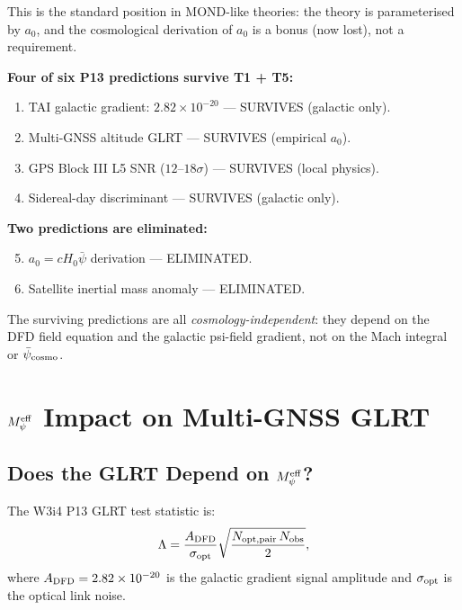 \documentclass[aps,prd,twocolumn,superscriptaddress,nofootinbib]{revtex4-2}
\newcommand{\Meff}{M_\psi^{\rm eff}}
\newcommand{\ee}[1]{\times 10^{#1}}
\begin{document}
This is the standard position in MOND-like theories: the theory is
parameterised by $a_0$, and the cosmological derivation of $a_0$ is a
bonus (now lost), not a requirement.

\begin{survivalbox}[title={T1 Survival Summary for P13}]
\textbf{Four of six P13 predictions survive T1 + T5:}
\begin{enumerate}
\item TAI galactic gradient: $2.82\ee{-20}$ --- SURVIVES (galactic only).
\item Multi-GNSS altitude GLRT --- SURVIVES (empirical $a_0$).
\item GPS Block III L5 SNR ($12$--$18\sigma$) --- SURVIVES (local physics).
\item Sidereal-day discriminant --- SURVIVES (galactic only).
\end{enumerate}
\textbf{Two predictions are eliminated:}
\begin{enumerate}
\setcounter{enumi}{4}
\item $a_0 = cH_0\bar{\psi}$ derivation --- ELIMINATED.
\item Satellite inertial mass anomaly --- ELIMINATED.
\end{enumerate}
The surviving predictions are all \emph{cosmology-independent}: they
depend on the DFD field equation and the galactic psi-field gradient,
not on the Mach integral or $\bar{\psi}_{\rm cosmo}$.
\end{survivalbox}

\section{$\Meff$ Impact on Multi-GNSS GLRT}
\label{sec:GLRT}

\subsection{Does the GLRT Depend on $\Meff$?}

The W3i4 P13 GLRT test statistic is:
\begin{equation}
\Lambda = \frac{A_{\rm DFD}}{\sigma_{\rm opt}}
\sqrt{\frac{N_{\rm opt,pair}\,N_{\rm obs}}{2}},
\label{eq:GLRT}
\end{equation}
where $A_{\rm DFD} = 2.82\ee{-20}$ is the galactic gradient signal
amplitude and $\sigma_{\rm opt}$ is the optical link noise.
\end{document}
